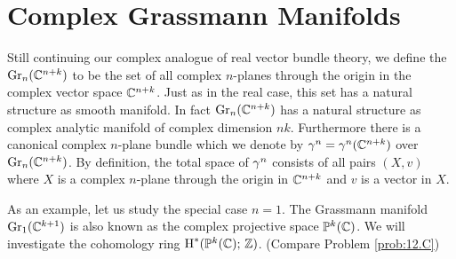 \documentclass[../main]{subfiles}
\begin{document}
\section{Complex Grassmann Manifolds}

Still continuing our complex analogue of real vector bundle theory, we define the  $\operatorname{Gr}_{n}(\mathbb C^{n+k})$ to be the set of all complex $n$-planes through the origin in the complex vector space $\mathbb C^{n+k}$. Just as in the real case, this set has a natural structure as smooth manifold. In fact $\operatorname{Gr}_{n}(\mathbb C^{n+k})$ has a natural structure as complex analytic manifold of complex dimension $nk$. Furthermore there is a canonical complex $n$-plane bundle which we denote by $\gamma^{n}=\gamma^{n}(\mathbb C^{n+k})$ over $\operatorname{Gr}_{n}(\mathbb C^{n+k})$. By definition, the total space of $\gamma^{n}$ consists of all pairs $(X, v)$ where $X$ is a complex $n$-plane through the origin in $\mathbb C^{n+k}$ and $v$ is a vector in $X$.

As an example, let us study the special case $n=1$. The Grassmann manifold $\operatorname{Gr}_{1}(\mathbb C^{k+1})$ is also known as the complex projective space $\mathbb{P}^{k}(\mathbb C)$. We will investigate the cohomology ring $\operatorname{H}^{\ast}(\mathbb{P}^k(\mathbb C) ;\, \mathbb{Z})$. (Compare Problem \ref{prob:12.C})
\end{document}
